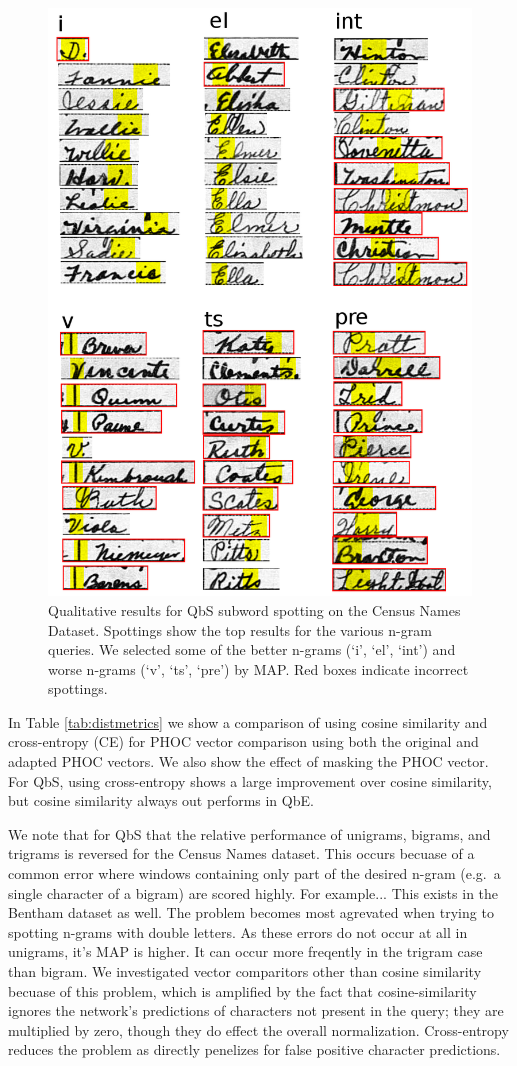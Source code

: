 \documentclass[ms,electronic,twosidetoc,letterpaper,chaptercenter,parttop,lof,lot]{byumsphd}
\begin{document}
\begin{figure}
    \centering
    \includegraphics[width=.6\textwidth]{qualSpotNames}
    \caption{Qualitative results for QbS subword spotting on the Census Names Dataset. Spottings show the top results for the various n-gram queries. We selected some of the better n-grams (`i', `el', `int') and worse n-grams (`v', `ts', `pre') by MAP. Red boxes indicate incorrect spottings. %
    }
    \label{fig:qualSpotNames}
\end{figure}

In Table \ref{tab:distmetrics} we show a comparison of using cosine similarity and cross-entropy (CE) for PHOC vector comparison using both the original and adapted PHOC vectors. We also show the effect of masking the PHOC vector. For QbS, using cross-entropy shows a large improvement over cosine similarity, but cosine similarity always out performs in QbE.

We note that for QbS that the relative performance of unigrams, bigrams, and trigrams is reversed for the Census Names dataset. This occurs becuase of a common error where windows containing only part of the desired n-gram (e.g.~a single character of a bigram) are scored highly. For example...
This exists in the Bentham dataset as well.
The problem becomes most agrevated when trying to spotting n-grams with double letters. As these errors do not occur at all in unigrams, it's MAP is higher. It can occur more freqently in the trigram case than bigram.
We investigated vector comparitors other than cosine similarity becuase of this problem, which is amplified by the fact that cosine-similarity ignores the network's predictions of characters not present in the query; they are multiplied by zero, though they do effect the overall normalization. Cross-entropy reduces the problem as directly penelizes for false positive character predictions.
\end{document}

